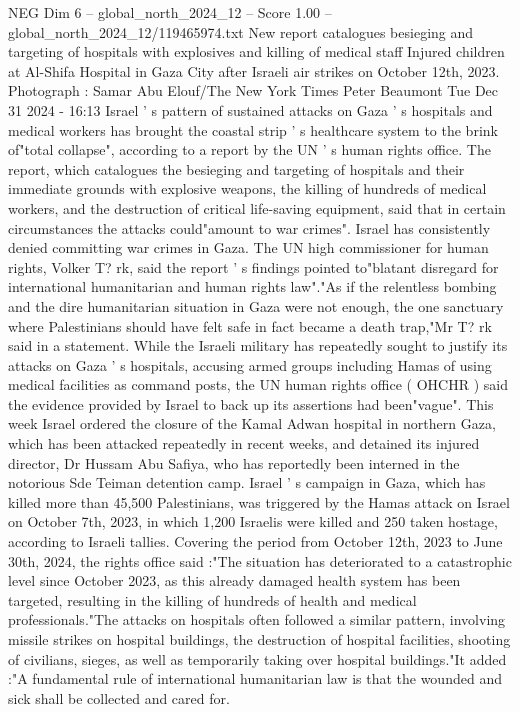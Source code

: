 \begin{textsample}{NEG Dim 6 – global\_north\_2024\_12 – Score 1.00 – global\_north\_2024\_12/119465974.txt}  \label{ex:f6_neg_182}
New report catalogues besieging and targeting of hospitals with explosives and killing of medical staff Injured children at Al-Shifa Hospital in Gaza City after Israeli air strikes on October 12th, 2023.
Photograph : Samar Abu Elouf/The New York Times Peter Beaumont Tue Dec 31 2024 - 16:13 Israel ' s pattern of sustained attacks on Gaza ' s hospitals and medical workers has brought the coastal strip ' s healthcare system to the brink of"total collapse", according to a report by the UN ' s human rights office.
The report, which catalogues the besieging and targeting of hospitals and their immediate grounds with explosive weapons, the killing of hundreds of medical workers, and the destruction of critical life-saving equipment, said that in certain circumstances the attacks could"amount to war crimes".
Israel has consistently denied committing war crimes in Gaza.
The UN high commissioner for human rights, Volker T? rk, said the report ' s findings pointed to"blatant disregard for international humanitarian and human rights law"."As if the relentless bombing and the dire humanitarian situation in Gaza were not enough, the one sanctuary where Palestinians should have felt safe in fact became a death trap,"Mr T? rk said in a statement.
While the Israeli military has repeatedly sought to justify its attacks on Gaza ' s hospitals, accusing armed groups including Hamas of using medical facilities as command posts, the UN human rights office ( OHCHR ) said the evidence provided by Israel to back up its assertions had been"vague".
This week Israel ordered the closure of the Kamal Adwan hospital in northern Gaza, which has been attacked repeatedly in recent weeks, and detained its injured director, Dr Hussam Abu Safiya, who has reportedly been interned in the notorious Sde Teiman detention camp.
Israel ' s campaign in Gaza, which has killed more than 45,500 Palestinians, was triggered by the Hamas attack on Israel on October 7th, 2023, in which 1,200 Israelis were killed and 250 taken hostage, according to Israeli tallies.
Covering the period from October 12th, 2023 to June 30th, 2024, the rights office said :"The situation has deteriorated to a catastrophic level since October 2023, as this already damaged health system has been targeted, resulting in the killing of hundreds of health and medical professionals."The attacks on hospitals often followed a similar pattern, involving missile strikes on hospital buildings, the destruction of hospital facilities, shooting of civilians, sieges, as well as temporarily taking over hospital buildings."It added :"A fundamental rule of international humanitarian law is that the wounded and sick shall be collected and cared for.

\end{textsample}
